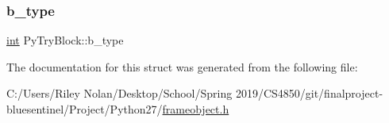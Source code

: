 \mbox{\label{struct_py_try_block_aa418848c5fe8697d30b6e77bcb6f27e9}} 
\subsubsection{\texorpdfstring{b\_type}{b\_type}}
{\footnotesize\ttfamily \mbox{\hyperlink{warnings_8h_a74f207b5aa4ba51c3a2ad59b219a423b}{int}} Py\+Try\+Block\+::b\+\_\+type}



The documentation for this struct was generated from the following file\+:\begin{DoxyCompactItemize}
\item 
C\+:/\+Users/\+Riley Nolan/\+Desktop/\+School/\+Spring 2019/\+C\+S4850/git/finalproject-\/bluesentinel/\+Project/\+Python27/\mbox{\hyperlink{frameobject_8h}{frameobject.\+h}}\end{DoxyCompactItemize}
